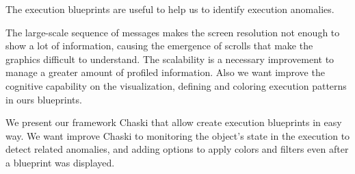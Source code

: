 \documentclass{sig-alternate}
\begin{document}
The execution blueprints are useful to help us to identify execution anomalies.

The large-scale sequence of messages makes the screen resolution not enough to show a lot of information, causing the emergence of scrolls that make the graphics difficult to understand. The scalability is a necessary improvement to manage a greater amount of profiled information. Also we want improve the cognitive capability on the visualization, defining and coloring execution patterns in ours blueprints.

We present our framework Chaski that allow create execution blueprints in easy way. We want improve Chaski to monitoring the object's state in the execution to detect related anomalies, and adding options to apply colors and filters even after a blueprint was displayed. 





\end{document}
